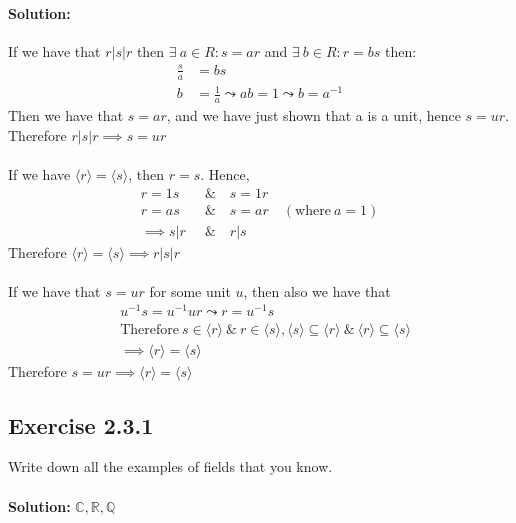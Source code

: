 \documentclass{article}
\begin{document}
\paragraph{Solution:}
If we have that $r|s|r$ then $\exists\ a \in R: s = ar$ and $ \exists\ b \in R: r = bs$ then:
    \begin{equation*}
        \begin{aligned}
            \frac{s}{a} &= bs\\
            b &= \frac{1}{a} \leadsto ab=1 \leadsto b = a^{-1}
        \end{aligned}
    \end{equation*}
Then we have that $s=ar$, and we have just shown that a is a unit, hence $s=ur$. Therefore $r|s|r \implies s = ur$
\\\\
If we have $\langle r \rangle = \langle s \rangle$, then $r=s$. Hence, 
\begin{equation*}
    \begin{aligned}
        r = 1s \quad &\&\quad s = 1r\\
        r = as \quad &\&\quad s = ar\quad (\text{where}\ a=1)\\
        \implies s|r  \ &\&\quad r|s
    \end{aligned}
\end{equation*}
Therefore $\langle r \rangle = \langle s \rangle \implies r|s|r$
\\\\
If we have that $s=ur$ for some unit $u$, then also we have that
\begin{equation*}
    \begin{aligned}
        &u^{-1}s = u^{-1}ur \leadsto r = u^{-1}s\\
        &\text{Therefore}\ s \in \langle r \rangle\ \&\ r \in \langle s \rangle, \langle s \rangle \subseteq \langle r \rangle\ \&\ \langle r \rangle \subseteq \langle s \rangle \\
        &\implies  \langle r \rangle = \langle s \rangle
    \end{aligned}
\end{equation*}
Therefore $s=ur \implies \langle r \rangle = \langle s \rangle$

\subsection*{Exercise 2.3.1}
Write down all the examples of fields that you know.
\\\\
\textbf{Solution:}
$\mathbb{C}, \mathbb{R}, \mathbb{Q}$
\end{document}
